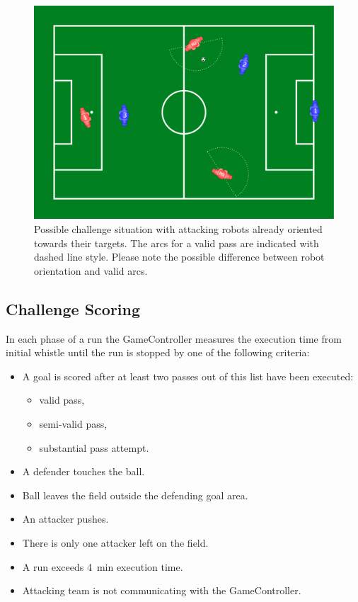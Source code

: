 \begin{figure}[ht!]
	\begin{center}
		\leavevmode
		\includegraphics[width=1\columnwidth]{figs/dbhc_arcs.pdf}
		\caption{Possible challenge situation with {\color{red} attacking robots} already oriented towards their targets. The arcs for a valid pass are indicated with dashed line style. Please note the possible difference between robot orientation and valid arcs.}
		\label{fig:ball_handling_arc_positions}
	\end{center}
\end{figure}

\subsection{Challenge Scoring}
\label{sec:Challenge_scoring}
In each phase of a run the GameController measures the execution time from initial whistle until the run is stopped by one of the following criteria:

\begin{itemize}
	\item A goal is scored after at least two passes out of this list have been executed:
	\begin{itemize}
		\item valid pass,
		\item semi-valid pass,
		\item substantial pass attempt.
	\end{itemize}
	\item A defender touches the ball.
	\item Ball leaves the field outside the defending goal area.
	\item An attacker pushes.
	\item There is only one attacker left on the field.
	\item A run exceeds \qty{4}{\minute} execution time.
	\item Attacking team is not communicating with the GameController.
\end{itemize}

